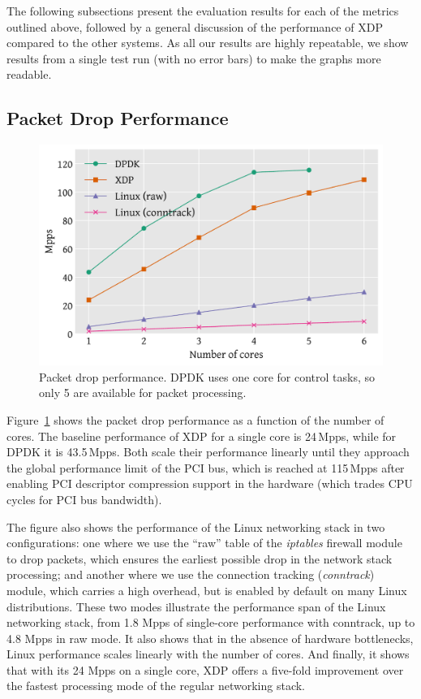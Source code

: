 \documentclass[sigconf]{acmart}
\begin{document}
The following subsections present the evaluation results for each of the metrics
outlined above, followed by a general discussion of the performance of XDP
compared to the other systems. As all our results are highly repeatable, we show
results from a single test run (with no error bars) to make the graphs more
readable.

\subsection{Packet Drop Performance}
\label{sec:basel-pack-proc}

\begin{figure}[t]
\centering
\includegraphics[width=\linewidth]{figures/drop-test.pdf}
\caption{\label{fig:drop-test} Packet drop performance. DPDK uses one core for
  control tasks, so only 5 are available for packet processing.}
\end{figure}

Figure~\ref{fig:drop-test} shows the packet drop performance as a function of
the number of cores. The baseline performance of XDP for a single core is
24\,Mpps, while for DPDK it is 43.5\,Mpps. Both scale their performance linearly
until they approach the global performance limit of the PCI bus, which is
reached at 115\,Mpps after enabling PCI descriptor compression support in the
hardware (which trades CPU cycles for PCI bus bandwidth).


The figure also shows the performance of the Linux networking stack in two
configurations: one where we use the ``raw'' table of the \emph{iptables}
firewall module to drop packets, which ensures the earliest possible drop in the
network stack processing; and another where we use the connection tracking
(\emph{conntrack}) module, which carries a high overhead, but is enabled by
default on many Linux distributions. These two modes illustrate the performance
span of the Linux networking stack, from 1.8 Mpps of single-core performance
with conntrack, up to 4.8 Mpps in raw mode. It also shows that in the absence of
hardware bottlenecks, Linux performance scales linearly with the number of
cores. And finally, it shows that with its 24 Mpps on a single core, XDP offers
a five-fold improvement over the fastest processing mode of the regular
networking stack.
\end{document}
